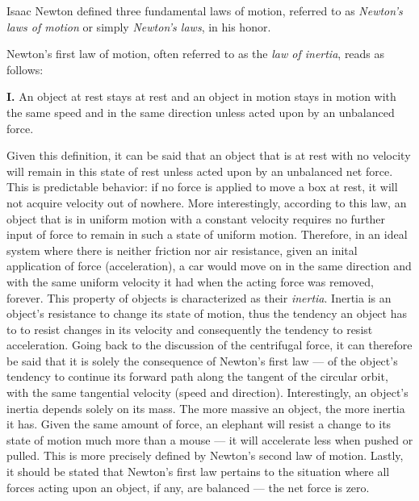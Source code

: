 
Isaac Newton defined three fundamental laws of motion, referred to as \emph{Newton's laws of motion} or simply \emph{Newton's laws}, in his honor.


Newton's first law of motion, often referred to as the \emph{law of inertia}, reads as follows: 

\begin{displayquote}
	\textbf{I.} An object at rest stays at rest and an object in motion stays in motion with the same speed and in the same direction unless acted upon by an unbalanced force.
\end{displayquote}

Given this definition, it can be said that an object that is at rest with no velocity will remain in this state of rest unless acted upon by an unbalanced net force. This is predictable behavior: if no force is applied to move a box at rest, it will not acquire velocity out of nowhere. More interestingly, according to this law, an object that is in uniform motion with a constant velocity requires no further input of force to remain in such a state of uniform motion. Therefore, in an ideal system where there is neither friction nor air resistance, given an inital application of force (acceleration), a car would move on in the same direction and with the same uniform velocity it had when the acting force was removed, forever. This property of objects is characterized as their \emph{inertia}. Inertia is an object's resistance to change its state of motion, thus the tendency an object has to to resist changes in its velocity and consequently the tendency to resist acceleration. Going back to the discussion of the centrifugal force, it can therefore be said that it is solely the consequence of Newton's first law --- of the object's tendency to continue its forward path along the tangent of the circular orbit, with the same tangential velocity (speed and direction). Interestingly, an object's inertia depends solely on its mass. The more massive an object, the more inertia it has. Given the same amount of force, an elephant will resist a change to its state of motion much more than a mouse --- it will accelerate less when pushed or pulled. This is more precisely defined by Newton's second law of motion. Lastly, it should be stated that Newton's first law pertains to the situation where all forces acting upon an object, if any, are balanced --- the net force is zero.

